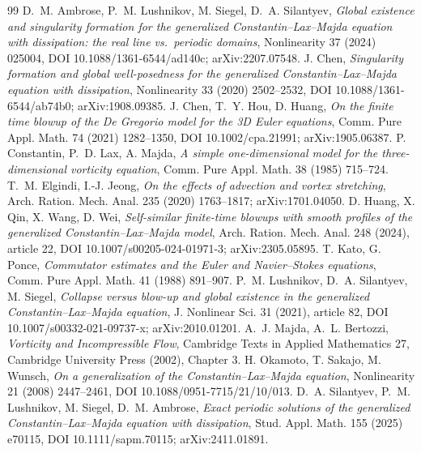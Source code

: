 \documentclass[11pt,a4paper]{article}
\theoremstyle{plain}
\theoremstyle{definition}
\theoremstyle{plain}
\begin{document}
\begin{thebibliography}{99}
 D.~M. Ambrose, P.~M. Lushnikov, M. Siegel, D.~A. Silantyev, \emph{Global existence and singularity formation for the generalized Constantin--Lax--Majda equation with dissipation: the real line vs.\ periodic domains}, Nonlinearity 37 (2024) 025004, DOI 10.1088/1361-6544/ad140c; arXiv:2207.07548.
 J. Chen, \emph{Singularity formation and global well-posedness for the generalized Constantin--Lax--Majda equation with dissipation}, Nonlinearity 33 (2020) 2502--2532, DOI 10.1088/1361-6544/ab74b0; arXiv:1908.09385.
 J. Chen, T.~Y. Hou, D. Huang, \emph{On the finite time blowup of the De Gregorio model for the 3D Euler equations}, Comm. Pure Appl. Math. 74 (2021) 1282--1350, DOI 10.1002/cpa.21991; arXiv:1905.06387.
 P. Constantin, P.~D. Lax, A. Majda, \emph{A simple one-dimensional model for the three-dimensional vorticity equation}, Comm. Pure Appl. Math. 38 (1985) 715--724.
 T.~M. Elgindi, I.-J. Jeong, \emph{On the effects of advection and vortex stretching}, Arch. Ration. Mech. Anal. 235 (2020) 1763--1817; arXiv:1701.04050.
 D. Huang, X. Qin, X. Wang, D. Wei, \emph{Self-similar finite-time blowups with smooth profiles of the generalized Constantin--Lax--Majda model}, Arch. Ration. Mech. Anal. 248 (2024), article 22, DOI 10.1007/s00205-024-01971-3; arXiv:2305.05895.
 T. Kato, G. Ponce, \emph{Commutator estimates and the Euler and Navier--Stokes equations}, Comm. Pure Appl. Math. 41 (1988) 891--907.
 P.~M. Lushnikov, D.~A. Silantyev, M. Siegel, \emph{Collapse versus blow-up and global existence in the generalized Constantin--Lax--Majda equation}, J. Nonlinear Sci. 31 (2021), article 82, DOI 10.1007/s00332-021-09737-x; arXiv:2010.01201.
 A.~J. Majda, A.~L. Bertozzi, \emph{Vorticity and Incompressible Flow}, Cambridge Texts in Applied Mathematics 27, Cambridge University Press (2002), Chapter 3.
 H. Okamoto, T. Sakajo, M. Wunsch, \emph{On a generalization of the Constantin--Lax--Majda equation}, Nonlinearity 21 (2008) 2447--2461, DOI 10.1088/0951-7715/21/10/013.
 D.~A. Silantyev, P.~M. Lushnikov, M. Siegel, D.~M. Ambrose, \emph{Exact periodic solutions of the generalized Constantin--Lax--Majda equation with dissipation}, Stud. Appl. Math. 155 (2025) e70115, DOI 10.1111/sapm.70115; arXiv:2411.01891.
\end{thebibliography}
\end{document}

